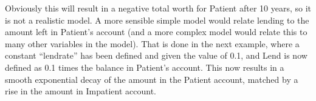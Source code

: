 \begin{center}
\end{center}

Obviously this will result in a negative total worth for Patient after
10 years, so it is not a realistic model. A more sensible simple model
would relate lending to the amount left in Patient's account (and a
more complex model would relate this to many other variables in the
model). That is done in the next example, where a constant ``lendrate''
has been defined and given the value of 0.1, and Lend is now defined
as 0.1 times the balance in Patient's account. This now results in a
smooth exponential decay of the amount in the Patient account, matched
by a rise in the amount in Impatient account.


